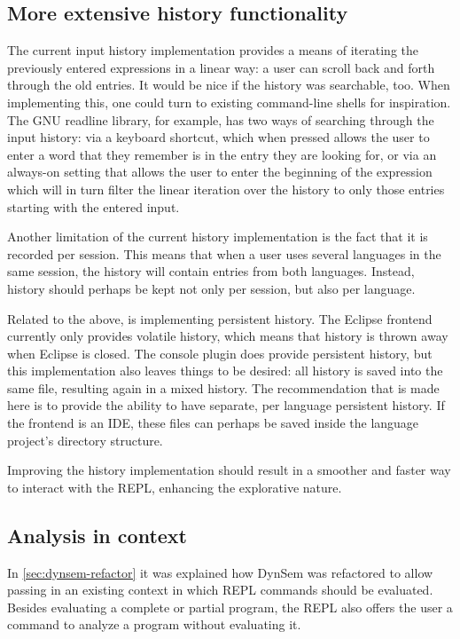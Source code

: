 \subsection{More extensive history functionality}

The current input history implementation provides a means of iterating the
previously entered expressions in a linear way: a user can scroll back and forth
through the old entries. It would be nice if the history was searchable, too.
When implementing this, one could turn to existing command-line shells for
inspiration. The GNU readline library, for example, has two ways of searching
through the input history: via a keyboard shortcut, which when pressed allows
the user to enter a word that they remember is in the entry they are looking
for, or via an always-on setting that allows the user to enter the beginning of
the expression which will in turn filter the linear iteration over the
history to only those entries starting with the entered input.

Another limitation of the current history implementation is the fact that it is
recorded per session. This means that when a user uses several languages in the
same session, the history will contain entries from both languages. Instead,
history should perhaps be kept not only per session, but also per language.

Related to the above, is implementing persistent history. The Eclipse frontend
currently only provides volatile history, which means that history is thrown
away when Eclipse is closed. The console plugin does provide persistent history,
but this implementation also leaves things to be desired: all history is saved
into the same file, resulting again in a mixed history. The recommendation that
is made here is to provide the ability to have separate, per language
persistent history. If the frontend is an IDE, these files can perhaps be saved
inside the language project's directory structure.

Improving the history implementation should result in a smoother and
faster way to interact with the REPL, enhancing the explorative nature.

\subsection{Analysis in context}

In \cref{sec:dynsem-refactor} it was explained how DynSem was refactored to
allow passing in an existing context in which REPL commands should be
evaluated. Besides evaluating a complete or partial program, the REPL also
offers the user a command to analyze a program without evaluating it.

